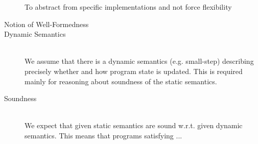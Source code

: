 \begin{description}
    
    To abstract from specific implementations and not force flexibility 

\item[Notion of Well-Formedness]
    
    
    
\item[Dynamic Semantics]~\\
    We assume that there is a dynamic semantics (e.g. small-step) describing precisely whether and how program state is updated.
    This is required mainly for reasoning about soundness of the static semantics.
    
\item[Soundness]~\\
    We expect that given static semantics are sound w.r.t. given dynamic semantics.
    This means that programs satisfying ... 
\end{description}